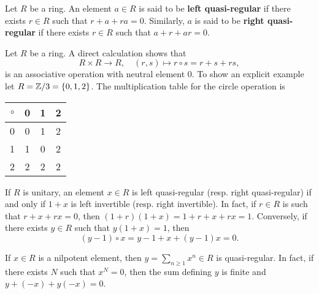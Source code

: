 \begin{definition}
Let $R$ be a ring. An element $a\in R$ is said to be 
\textbf{left quasi-regular} if there exists $r\in R$ such that $r+a+ra=0$. Similarly, 
$a$ is said to be \textbf{right quasi-regular} if there exists $r\in R$ such that $a+r+ar=0$. 
\end{definition}

Let $R$ be a ring. A direct calculation shows that
\[
R\times R\to R,
\quad
(r,s)\mapsto r\circ s=r+s+rs,
\]
is an associative operation with neutral element $0$.
To show an explicit example let $R=\mathbb{Z}/3=\{0,1,2\}$. 
The multiplication table for the circle 
operation is  
	\begin{table}[ht]
		\centering
		\begin{tabular}{c|ccc}
			$\circ$ & 0 & 1 & 2\tabularnewline
			\hline
			0 & 0 & 1 & 2\tabularnewline
			1 & 1 & 0 & 2\tabularnewline
			2 & 2 & 2 & 2\tabularnewline
		\end{tabular}
 	\end{table}


If $R$ is unitary, an element $x\in R$ is left quasi-regular (resp. right quasi-regular)
if and only if $1+x$ is left invertible (resp. right invertible). In fact, 
if $r\in R$ is such that $r+x+rx=0$, then $(1+r)(1+x)=1+r+x+rx=1$.
Conversely, if there exists $y\in R$ such that $y(1+x)=1$, then  
\[
(y-1)\circ x=y-1+x+(y-1)x=0.
\]

\begin{example}
	If $x\in R$ is a nilpotent element, 
    then $y=\sum_{n\geq1}x^n\in R$ is quasi-regular. 
	In fact, if there exists $N$ such that $x^N=0$, 
    then the sum defining $y$ is finite 
    and $y+(-x)+y(-x)=0$.  
\end{example}

